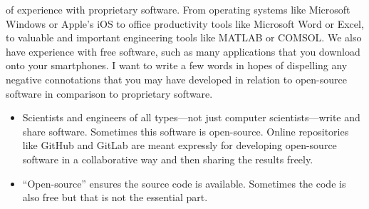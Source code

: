  of experience with proprietary software.  From operating systems like Microsoft Windows or Apple's iOS to office productivity tools like Microsoft Word or Excel, to valuable and important engineering tools like MATLAB or COMSOL.  We also have experience with free software, such as many applications that you download onto your smartphones.  I want to write a few words in hopes of dispelling any negative connotations that you may have developed in relation to open-source software in comparison to proprietary software.
\begin{itemize}
\item Scientists and engineers of all types---not just computer scientists---write and share software.  Sometimes this software is open-source.  Online repositories like GitHub and GitLab are meant expressly for developing open-source software in a collaborative way and then sharing the results freely.
\item ``Open-source'' ensures the source code is available.  Sometimes the code is also free but that is not the essential part.


\end{itemize}
